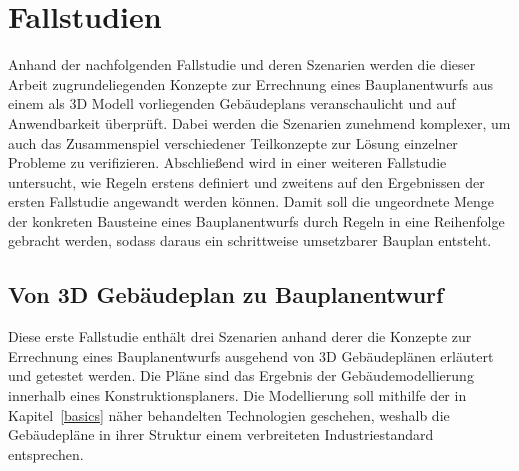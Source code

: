 \chapter{Fallstudien}\label{scenarios}
Anhand der nachfolgenden Fallstudie und deren Szenarien werden die dieser Arbeit zugrundeliegenden Konzepte zur Errechnung eines Bauplanentwurfs aus einem als 3D Modell vorliegenden Gebäudeplans veranschaulicht und auf Anwendbarkeit überprüft.
Dabei werden die Szenarien zunehmend komplexer, um auch das Zusammenspiel verschiedener Teilkonzepte zur Lösung einzelner Probleme zu verifizieren.
Abschließend wird in einer weiteren Fallstudie untersucht, wie Regeln erstens definiert und zweitens auf den Ergebnissen der ersten Fallstudie angewandt werden können.
Damit soll die ungeordnete Menge der konkreten Bausteine eines Bauplanentwurfs durch Regeln in eine Reihenfolge gebracht werden, sodass daraus ein schrittweise umsetzbarer Bauplan entsteht.

\section{Von 3D Gebäudeplan zu Bauplanentwurf}
Diese erste Fallstudie enthält drei Szenarien anhand derer die Konzepte zur Errechnung eines Bauplanentwurfs ausgehend von 3D Gebäudeplänen erläutert und getestet werden.
Die Pläne sind das Ergebnis der Gebäudemodellierung innerhalb eines Konstruktionsplaners.
Die Modellierung soll mithilfe der in Kapitel~\ref{basics} näher behandelten Technologien geschehen, weshalb die Gebäudepläne in ihrer Struktur einem verbreiteten Industriestandard entsprechen.

